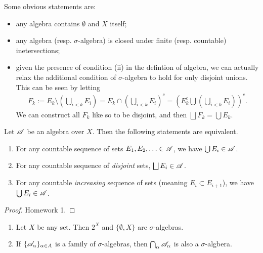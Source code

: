 \documentclass[12pt]{article} %
\begin{document}
\begin{remark}
    Some obvious statements are: \begin{itemize}
        \item any algebra contains $\emptyset$ and $X$ itself;
        \item any algebra (resp. $\sigma$-algebra) is closed under finite (resp. countable) inetersections;
        \item given the presence of condition (ii) in the defintion of algebra, we can actually relax the additional condition of $\sigma$-algebra to hold for only disjoint unions. This can be seen by letting \begin{align*}
            F_k := E_k \setminus \left( \bigcup_{i < k} E_i \right) = E_k \cap \left( \bigcup_{i < k} E_i \right)^c = \left( E_k^c \bigcup \left( \bigcup_{i < k} E_i \right) \right)^c.
        \end{align*} We can construct all $F_k$ like so to be disjoint, and then $\bigsqcup F_k = \bigcup E_k$.
    \end{itemize}
\end{remark}

\begin{lemma}
    Let $\mathscr{A}$ be an algebra over $X$. Then the following statements are equivalent. \begin{enumerate}
        \item For any countable sequence of sets $E_1, E_2, \ldots \in \mathscr{A}$, we have $\bigcup E_i \in \mathscr{A}$.
        \item For any countable sequence of \textit{disjoint} sets, $\bigsqcup E_i \in \mathscr{A}$.
        \item For any countable \textit{increasing} sequence of sets (meaning $E_i \subset E_{i+1}$), we have $\bigcup E_i \in \mathscr{A}$.
    \end{enumerate}
\end{lemma}

\begin{proof}
    Homework 1.
\end{proof}

\begin{example}
    \begin{enumerate}
        \item Let $X$ be any set. Then $2^X$ and $\{\emptyset, X\}$ are $\sigma$-algebras.
        \item If $\{\mathscr{A}_\alpha\}_{\alpha \in A}$ is a family of $\sigma$-algebras, then $\bigcap_{\alpha} \mathscr{A}_\alpha$ is also a $\sigma$-algbera.
    \end{enumerate}
\end{example}
\end{document}
